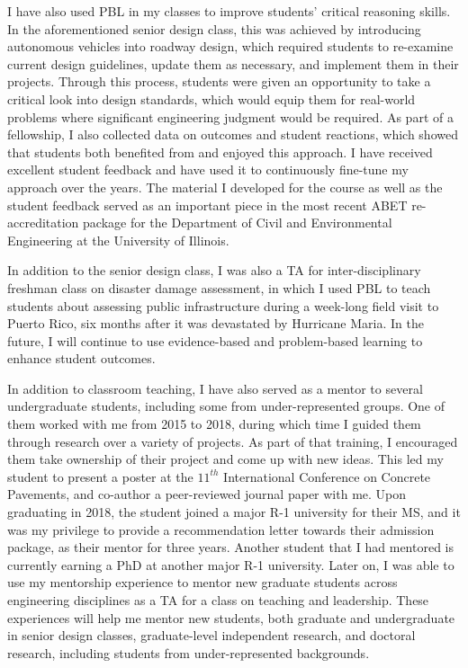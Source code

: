 \documentclass[12pt]{article}
\begin{document}
I have also used PBL in my classes to improve students' critical reasoning skills. In the aforementioned senior design class, this was achieved by introducing autonomous vehicles into roadway design, which required students to re-examine current design guidelines, update them as necessary, and implement them in their projects. Through this process, students were given an opportunity to take a critical look into design standards, which would equip them for real-world problems where significant engineering judgment would be required. As part of a fellowship, I also collected data on outcomes and student reactions, which showed that students both benefited from and enjoyed this approach. I have received excellent student feedback and have used it to continuously fine-tune my approach over the years. The material I developed for the course as well as the student feedback served as an important piece in the most recent ABET re-accreditation package for the Department of Civil and Environmental Engineering at the University of Illinois.

In addition to the senior design class, I was also a TA for inter-disciplinary freshman class on disaster damage assessment, in which I used PBL to teach students about assessing public infrastructure during a week-long field visit to Puerto Rico, six months after it was devastated by Hurricane Maria. In the future, I will continue to use evidence-based and problem-based learning to enhance student outcomes.

In addition to classroom teaching, I have also served as a mentor to several undergraduate students, including some from under-represented groups. One of them worked with me from 2015 to 2018, during which time I guided them through research over a variety of projects. As part of that training, I encouraged them take ownership of their project and come up with new ideas. This led my student to present a poster at the $11^{th}$ International Conference on Concrete Pavements, and co-author a peer-reviewed journal paper with me. Upon graduating in 2018, the student joined a major R-1 university for their MS, and it was my privilege to provide a recommendation letter towards their admission package, as their mentor for three years. Another student that I had mentored is currently earning a PhD at another major R-1 university. Later on, I was able to use my mentorship experience to mentor new graduate students across engineering disciplines as a TA for a class on teaching and leadership. These experiences will help me mentor new students, both graduate and undergraduate in senior design classes, graduate-level independent research, and doctoral research, including students from under-represented backgrounds.
\end{document}
